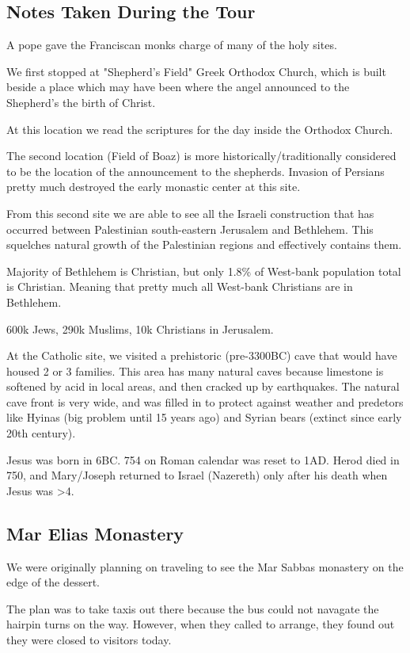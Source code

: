 \documentclass[letterpaper]{report}
\begin{document}
\clearpage
\subsection{Notes Taken During the Tour}
A pope gave the Franciscan monks charge of many of the holy sites.

We first stopped at "Shepherd's Field" Greek Orthodox Church, which is built beside a place which may have been where the angel announced to the Shepherd's the birth of Christ.

At this location we read the scriptures for the day inside the Orthodox Church.

The second location (Field of Boaz) is more historically/traditionally considered to be the location of the announcement to the shepherds.
Invasion of Persians pretty much destroyed the early monastic center at this site.

From this second site we are able to see all the Israeli construction that has occurred between Palestinian south-eastern Jerusalem and Bethlehem. This squelches natural growth of the Palestinian regions and effectively contains them.

Majority of Bethlehem is Christian, but only 1.8\% of West-bank population total is Christian. Meaning that pretty much all West-bank Christians are in Bethlehem.

600k Jews, 290k Muslims, 10k Christians in Jerusalem.

At the Catholic site, we visited a prehistoric (pre-3300BC) cave that would have housed 2 or 3 families. This area has many natural caves because limestone is softened by acid in local areas, and then cracked up by earthquakes. The natural cave front is very wide, and was filled in to protect against weather and predetors like Hyinas (big problem until 15 years ago) and Syrian bears (extinct since early 20th century).

Jesus was born in 6BC. 754 on Roman calendar was reset to 1AD. Herod died in 750, and Mary/Joseph returned to Israel (Nazereth) only after his death when Jesus was >4.

\subsection{Mar Elias Monastery}

We were originally planning on traveling to see the Mar Sabbas monastery on the edge of the dessert.

The plan was to take taxis out there because the bus could not navagate the hairpin turns on the way. However, when they called to arrange, they found out they were closed to visitors today.
\end{document}
